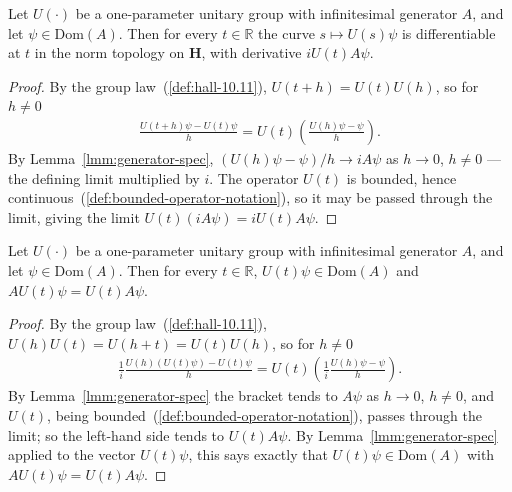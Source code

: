 \begin{lemma}
    \label{lmm:orbit-hasDerivAt}
    \leanok
    Let $U(\cdot)$ be a one-parameter unitary group with infinitesimal generator $A$, and let $\psi \in \text{Dom}(A)$. Then for every $t \in \mathbb{R}$ the curve $s \mapsto U(s)\psi$ is differentiable at $t$ in the norm topology on $\mathbf{H}$, with derivative $iU(t)A\psi$.
\end{lemma}
\begin{proof}
    \leanok
By the group law~(\ref{def:hall-10.11}), $U(t+h) = U(t)U(h)$, so for $h \ne 0$
\begin{align}
    \frac{U(t+h)\psi - U(t)\psi}{h} = U(t)\left( \frac{U(h)\psi - \psi}{h} \right).
\end{align}
By Lemma~\ref{lmm:generator-spec}, $\left( U(h)\psi - \psi \right)/h \to iA\psi$ as $h \to 0$, $h \ne 0$ — the defining limit multiplied by $i$. The operator $U(t)$ is bounded, hence continuous~(\ref{def:bounded-operator-notation}), so it may be passed through the limit, giving the limit $U(t)(iA\psi) = iU(t)A\psi$.
\end{proof}

\begin{lemma}
    \label{lmm:generator-commutes}
    \leanok
    Let $U(\cdot)$ be a one-parameter unitary group with infinitesimal generator $A$, and let $\psi \in \text{Dom}(A)$. Then for every $t \in \mathbb{R}$, $U(t)\psi \in \text{Dom}(A)$ and $AU(t)\psi = U(t)A\psi$.
\end{lemma}
\begin{proof}
    \leanok
By the group law~(\ref{def:hall-10.11}), $U(h)U(t) = U(h+t) = U(t)U(h)$, so for $h \ne 0$
\begin{align}
    \frac{1}{i}\frac{U(h)\left( U(t)\psi \right) - U(t)\psi}{h} = U(t)\left( \frac{1}{i}\frac{U(h)\psi - \psi}{h} \right).
\end{align}
By Lemma~\ref{lmm:generator-spec} the bracket tends to $A\psi$ as $h \to 0$, $h \ne 0$, and $U(t)$, being bounded~(\ref{def:bounded-operator-notation}), passes through the limit; so the left-hand side tends to $U(t)A\psi$. By Lemma~\ref{lmm:generator-spec} applied to the vector $U(t)\psi$, this says exactly that $U(t)\psi \in \text{Dom}(A)$ with $AU(t)\psi = U(t)A\psi$.
\end{proof}

